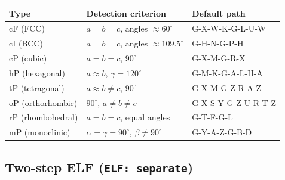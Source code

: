 \documentclass[11pt,a4paper]{scrartcl}
\newcommand{\thead}{\rowcolor{lightblue}}
\begin{document}
\begin{tabularx}{\linewidth}{@{}llX@{}}
\thead
Type & Detection criterion & Default path \\ \midrule
cF (FCC) & $a{=}b{=}c$, angles $\approx 60^\circ$
         & G-X-W-K-G-L-U-W \\
cI (BCC) & $a{=}b{=}c$, angles $\approx 109.5^\circ$
         & G-H-N-G-P-H \\
cP (cubic) & $a{=}b{=}c$, $90^\circ$
          & G-X-M-G-R-X \\
hP (hexagonal) & $a{\approx}b$, $\gamma{=}120^\circ$
              & G-M-K-G-A-L-H-A \\
tP (tetragonal) & $a{\approx}b{\neq}c$, $90^\circ$
               & G-X-M-G-Z-R-A-Z \\
oP (orthorhombic) & $90^\circ$, $a{\neq}b{\neq}c$
                 & G-X-S-Y-G-Z-U-R-T-Z \\
rP (rhombohedral) & $a{=}b{=}c$, equal angles
                 & G-T-F-G-L \\
mP (monoclinic) & $\alpha{=}\gamma{=}90^\circ$, $\beta{\neq}90^\circ$
               & G-Y-A-Z-G-B-D \\
\bottomrule
\end{tabularx}

\subsection{Two-step ELF (\texttt{ELF: separate})}
\label{sec:elf-separate}
\end{document}
